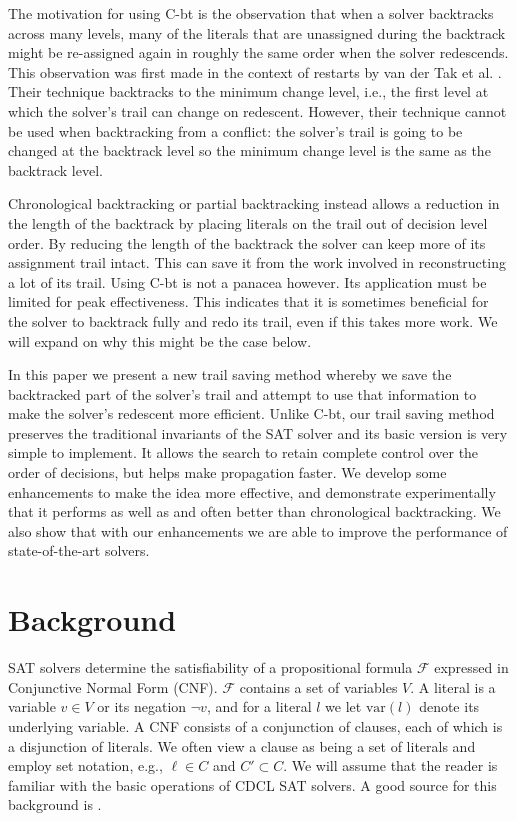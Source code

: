 \documentclass[runningheads]{llncs}
\newcommand{\sat}{SAT\xspace}
\newcommand{\var}{\text{var}}
\newcommand{\formula}{\ensuremath{\mathcal{F}}}
\newcommand{\cbt}{C-bt\xspace}
\begin{document}
The motivation for using \cbt is the observation that when a solver
backtracks across many levels, many of the literals that are
unassigned during the backtrack might be re-assigned again in roughly
the same order when the solver redescends. This observation was first
made in the context of restarts by van der Tak et
al. \cite{DBLP:journals/jsat/TakRH11}. Their technique backtracks to
the minimum change level, i.e., the first level at which the solver's
trail can change on redescent. However, their technique cannot be used
when backtracking from a conflict: the solver's trail is going to be
changed at the backtrack level so the minimum change level is the same
as the backtrack level. 

Chronological backtracking or partial backtracking instead allows a
reduction in the length of the backtrack by placing literals on the
trail out of decision level order. By reducing the length of the
backtrack the solver can keep more of its assignment trail
intact. This can save it from the work involved in reconstructing a
lot of its trail. Using \cbt is not a panacea however. Its application
must be limited for peak effectiveness. This indicates that it is
sometimes beneficial for the solver to backtrack fully and redo its
trail, even if this takes more work. We will expand on why this might
be the case below.

In this paper we present a new trail saving method whereby we save
the backtracked part of the solver's trail and attempt to use that
information to make the solver's redescent more efficient. Unlike
\cbt, our trail saving method preserves the traditional invariants of
the SAT solver and its basic version is very simple to implement. It
allows the search to retain complete control over the order of
decisions, but helps make propagation faster. We develop some
enhancements to make the idea more effective, and demonstrate
experimentally that it performs as well as and often better than
chronological backtracking. We also show that with our enhancements we
are able to improve the performance of state-of-the-art solvers.

\section{Background}
\label{sec:background}
\sat solvers determine the satisfiability of a propositional formula
$\formula$ expressed in Conjunctive Normal Form (CNF). $\formula$
contains a set of variables $V$. A literal is a variable $v\in V$ or
its negation $\lnot v$, and for a literal $l$ we let $\var(l)$ denote
its underlying variable. A CNF consists of a conjunction of clauses,
each of which is a disjunction of literals. We often view a clause as
being a set of literals and employ set notation, e.g., $\ell\in C$ and
$C'\subset C$. We will assume that the reader is familiar with the
basic operations of CDCL \sat solvers. A good source for this
background is \cite{DBLP:series/faia/SilvaLM09}.
\end{document}
